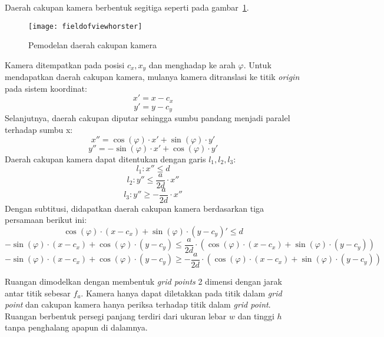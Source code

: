 Daerah cakupan kamera berbentuk segitiga seperti pada gambar~\ref{fig:fieldofviewhorster}.
\begin{figure}[H]
	\centering
	\texttt{[image: fieldofviewhorster]}
	\caption[Pemodelan daerah cakupan kamera]{Pemodelan daerah cakupan kamera}
	\label{fig:fieldofviewhorster}
\end{figure}
Kamera ditempatkan pada posisi \(c_x,x_y\) dan menghadap ke arah \(\varphi\). Untuk mendapatkan daerah cakupan kamera, mulanya kamera ditranslasi ke titik \textit{origin} pada sistem koordinat:
\begin{equation}
	x'=x-c_x
\end{equation}
\begin{equation}
	y'=y-c_y
\end{equation}
Selanjutnya, daerah cakupan diputar sehingga sumbu pandang menjadi paralel terhadap sumbu x:
\begin{equation}
	x''=\cos(\varphi)\cdot x'+\sin(\varphi)\cdot y'
\end{equation}
\begin{equation}
	y''=-\sin(\varphi)\cdot x'+\cos(\varphi)\cdot y'
\end{equation}
Daerah cakupan kamera dapat ditentukan dengan garis \(l_1,l_2,l_3\):
\begin{equation}
	l_1:x''\leq d
\end{equation}
\begin{equation}
	l_2:y''\leq \frac{a}{2d}\cdot x''
\end{equation}
\begin{equation}
	l_3:y''\geq-\frac{a}{2d}\cdot x''
\end{equation}
Dengan subtitusi, didapatkan daerah cakupan kamera berdasarkan tiga persamaan berikut ini:
\begin{equation}
	\cos(\varphi)\cdot(x-c_x)+\sin(\varphi)\cdot(y-c_y)'\leq d
	\label{eq:l1}
\end{equation}
\begin{equation}
	-\sin(\varphi)\cdot(x-c_x)+\cos(\varphi)\cdot(y-c_y)\leq \frac{a}{2d}\cdot (\cos(\varphi)\cdot(x-c_x)+\sin(\varphi)\cdot(y-c_y))	\label{eq:l2}
\end{equation}
\begin{equation}
	-\sin(\varphi)\cdot(x-c_x)+\cos(\varphi)\cdot(y-c_y)\geq- \frac{a}{2d}\cdot (\cos(\varphi)\cdot(x-c_x)+\sin(\varphi)\cdot(y-c_y))
	\label{eq:l3}
\end{equation}

Ruangan dimodelkan dengan membentuk \textit{grid points} 2 dimensi dengan jarak antar titik sebesar \(f_a\). Kamera hanya dapat diletakkan pada titik dalam \textit{grid point} dan cakupan kamera hanya periksa terhadap titik dalam \textit{grid point}. Ruangan berbentuk persegi panjang terdiri dari ukuran lebar \(w\) dan tinggi \(h\) tanpa penghalang apapun di dalamnya.

